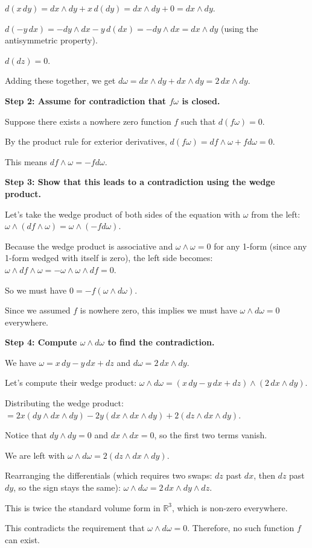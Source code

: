 \begin{solution}
$d(x\, dy) = dx \wedge dy + x\, d(dy) = dx \wedge dy + 0 = dx \wedge dy$.

$d(-y\, dx) = -dy \wedge dx - y\, d(dx) = -dy \wedge dx = dx \wedge dy$ (using the antisymmetric property).

$d(dz) = 0$.

Adding these together, we get $d\omega = dx \wedge dy + dx \wedge dy = 2\, dx \wedge dy$.

\textbf{Step 2: Assume for contradiction that $f\omega$ is closed.}

Suppose there exists a nowhere zero function $f$ such that $d(f\omega) = 0$.

By the product rule for exterior derivatives, $d(f\omega) = df \wedge \omega + f d\omega = 0$.

This means $df \wedge \omega = -f d\omega$.

\textbf{Step 3: Show that this leads to a contradiction using the wedge product.}

Let's take the wedge product of both sides of the equation with $\omega$ from the left:
$\omega \wedge (df \wedge \omega) = \omega \wedge (-f d\omega)$.

Because the wedge product is associative and $\omega \wedge \omega = 0$ for any 1-form (since any 1-form wedged with itself is zero), the left side becomes:
$\omega \wedge df \wedge \omega = -\omega \wedge \omega \wedge df = 0$.

So we must have $0 = -f (\omega \wedge d\omega)$. 

Since we assumed $f$ is nowhere zero, this implies we must have $\omega \wedge d\omega = 0$ everywhere.

\textbf{Step 4: Compute $\omega \wedge d\omega$ to find the contradiction.}

We have $\omega = x\, dy - y\, dx + dz$ and $d\omega = 2\, dx \wedge dy$.

Let's compute their wedge product:
$\omega \wedge d\omega = (x\, dy - y\, dx + dz) \wedge (2\, dx \wedge dy)$.

Distributing the wedge product:
$= 2x(dy \wedge dx \wedge dy) - 2y(dx \wedge dx \wedge dy) + 2(dz \wedge dx \wedge dy)$.

Notice that $dy \wedge dy = 0$ and $dx \wedge dx = 0$, so the first two terms vanish.

We are left with $\omega \wedge d\omega = 2(dz \wedge dx \wedge dy)$.

Rearranging the differentials (which requires two swaps: $dz$ past $dx$, then $dz$ past $dy$, so the sign stays the same):
$\omega \wedge d\omega = 2\, dx \wedge dy \wedge dz$.

This is twice the standard volume form in $\mathbb{R}^3$, which is non-zero everywhere. 

This contradicts the requirement that $\omega \wedge d\omega = 0$. Therefore, no such function $f$ can exist.
\end{solution}

